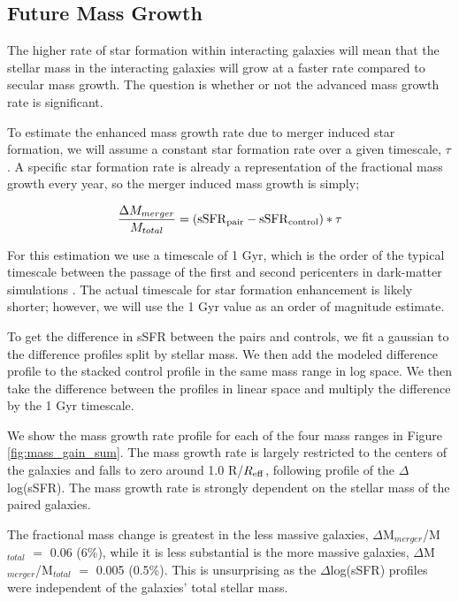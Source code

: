 \documentclass[iop,revtex4,twocolumn,apj,numberedappendix,appendixfloats]{emulateapj}
\newcommand{\reff}{$R_{\rm eff}$}
\begin{document}
\subsection{Future Mass Growth}

The higher rate of star formation within interacting galaxies will mean that the stellar mass in the interacting galaxies will grow at a faster rate compared to secular mass growth. The question is whether or not the advanced mass growth rate is significant. 

To estimate the enhanced mass growth rate due to merger induced star formation, we will assume a constant star formation rate over a given timescale, $\tau$. A specific star formation rate is already a representation of the fractional mass growth every year, so the merger induced mass growth is simply;

\begin{equation}
\frac{\Delta M_{merger}}{M_{total}} = \left({\rm sSFR}_{\rm pair} - {\rm sSFR}_{\rm control}\right) * \tau
\end{equation}

For this estimation we use a timescale of 1 Gyr, which is the order of the typical timescale between the passage of the first and second pericenters in dark-matter simulations \citep{Boylan-Kolchin:2008}. The actual timescale for star formation enhancement is likely shorter; however, we will use the 1 Gyr value as an order of magnitude estimate. 

To get the difference in sSFR between the pairs and controls, we fit a gaussian to the difference profiles split by stellar mass. We then add the modeled difference profile to the stacked control profile in the same mass range in log space. We then take the difference between the profiles in linear space and multiply the difference by the 1 Gyr timescale. 

We show the mass growth rate profile for each of the four mass ranges in Figure \ref{fig:mass_gain_sum}. The mass growth rate is largely restricted to the centers of the galaxies and falls to zero around 1.0 R/\reff, following profile of the $\Delta$log(sSFR). The mass growth rate is strongly dependent on the stellar mass of the paired galaxies. 

The fractional mass change is greatest in the less massive galaxies, $\Delta$M$_{merger}$/M$_{total}$ $=$ 0.06 (6\%), while it is less substantial is the more massive galaxies, $\Delta$M$_{merger}$/M$_{total}$ $=$ 0.005 (0.5\%). This is unsurprising as the $\Delta$log(sSFR) profiles were independent of the galaxies' total stellar mass. 
\end{document}
